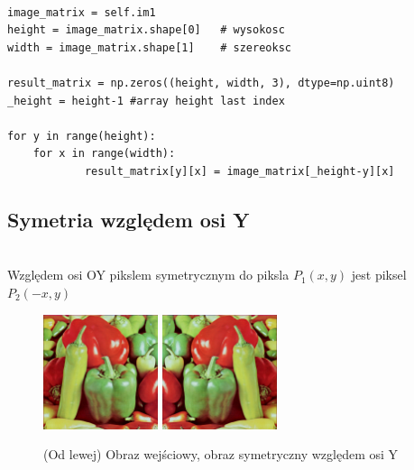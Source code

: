 \documentclass[final,a4paper,openany,12pt]{mwbk}
\begin{document}
\begin{lstlisting}[caption= Symetrie względem osi X]

image_matrix = self.im1
height = image_matrix.shape[0]   # wysokosc
width = image_matrix.shape[1]    # szereoksc

result_matrix = np.zeros((height, width, 3), dtype=np.uint8)
_height = height-1 #array height last index

for y in range(height):
    for x in range(width): 
            result_matrix[y][x] = image_matrix[_height-y][x]

\end{lstlisting}
\newpage

\subsection*{ Symetria względem osi Y}
\hfill\\
\indent
Względem osi OY pikslem symetrycznym do piksla $P_{1}(x,y)$ jest piksel $P_{2}(-x,y)$


\begin{figure}[H]
	\begin{center}
		\includegraphics[width=0.3\textwidth]{1/1Geo_oy_Original}
		\includegraphics[width=0.3\textwidth]{1/1Geo_oy_Result}
	\end{center}
	\caption{(Od lewej) Obraz wejściowy, obraz symetryczny względem osi Y }
\end{figure}
\end{document}
